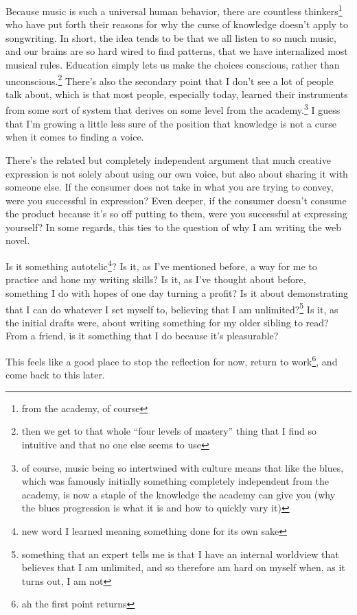 \documentclass[12pt]{article}[titlepage]
\newcommand{\say}[1]{``#1''}
\renewcommand{\,}{\textsuperscript{,}}
\begin{document}
Because music is such a universal human behavior, there are countless thinkers\footnote{from the academy, of course} who have put forth their reasons for why the curse of knowledge doesn't apply to songwriting.  
In short, the idea tends to be that we all listen to so much music, and our brains are so hard wired to find patterns, that we have internalized most musical rules.  
Education simply lets us make the choices conscious, rather than unconscious.\footnote{then we get to that whole \say{four levels of mastery} thing that I find so intuitive and that no one else seems to use}  
There's also the secondary point that I don't see a lot of people talk about, which is that most people, especially today, learned their instruments from some sort of system that derives on some level from the academy.\footnote{of course, music being so intertwined with culture means that like the blues, which was famously initially something completely independent from the academy, is now a staple of the knowledge the academy can give you (why the blues progression is what it is and how to quickly vary it)}  
I guess that I'm growing a little less sure of the position that knowledge is not a curse when it comes to finding a voice.

There's the related but completely independent argument that much creative expression is not solely about using our own voice, but also about sharing it with someone else.  
If the consumer does not take in what you are trying to convey, were you successful in expression?  
Even deeper, if the consumer doesn't consume the product because it's so off putting to them, were you successful at expressing yourself?  
In some regards, this ties to the question of why I am writing the web novel.

Is it something autotelic\footnote{new word I learned meaning something done for its own sake}?  
Is it, as I've mentioned before, a way for me to practice and hone my writing skills?  
Is it, as I've thought about before, something I do with hopes of one day turning a profit?  
Is it about demonstrating that I can do whatever I set myself to, believing that I am unlimited?\footnote{something that an expert tells me is that I have an internal worldview that believes that I am unlimited, and so therefore am hard on myself when, as it turns out, I am not}  
Is it, as the initial drafts were, about writing something for my older sibling to read?  
From a friend, is it something that I do because it's pleasurable?

This feels like a good place to stop the reflection for now, return to work\footnote{ah the first point returns}, and come back to this later.
\end{document}
